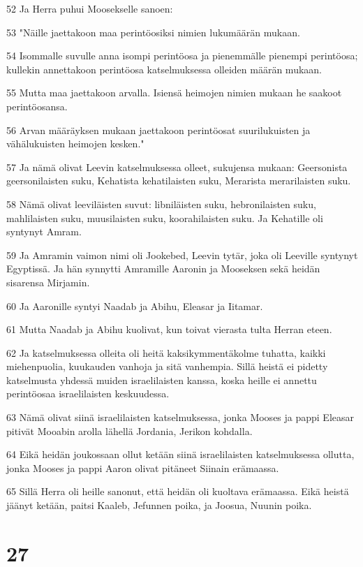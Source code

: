 \par 52 Ja Herra puhui Moosekselle sanoen:
\par 53 "Näille jaettakoon maa perintöosiksi nimien lukumäärän mukaan.
\par 54 Isommalle suvulle anna isompi perintöosa ja pienemmälle pienempi perintöosa; kullekin annettakoon perintöosa katselmuksessa olleiden määrän mukaan.
\par 55 Mutta maa jaettakoon arvalla. Isiensä heimojen nimien mukaan he saakoot perintöosansa.
\par 56 Arvan määräyksen mukaan jaettakoon perintöosat suurilukuisten ja vähälukuisten heimojen kesken."
\par 57 Ja nämä olivat Leevin katselmuksessa olleet, sukujensa mukaan: Geersonista geersonilaisten suku, Kehatista kehatilaisten suku, Merarista merarilaisten suku.
\par 58 Nämä olivat leeviläisten suvut: libniläisten suku, hebronilaisten suku, mahlilaisten suku, muusilaisten suku, koorahilaisten suku. Ja Kehatille oli syntynyt Amram.
\par 59 Ja Amramin vaimon nimi oli Jookebed, Leevin tytär, joka oli Leeville syntynyt Egyptissä. Ja hän synnytti Amramille Aaronin ja Mooseksen sekä heidän sisarensa Mirjamin.
\par 60 Ja Aaronille syntyi Naadab ja Abihu, Eleasar ja Iitamar.
\par 61 Mutta Naadab ja Abihu kuolivat, kun toivat vierasta tulta Herran eteen.
\par 62 Ja katselmuksessa olleita oli heitä kaksikymmentäkolme tuhatta, kaikki miehenpuolia, kuukauden vanhoja ja sitä vanhempia. Sillä heistä ei pidetty katselmusta yhdessä muiden israelilaisten kanssa, koska heille ei annettu perintöosaa israelilaisten keskuudessa.
\par 63 Nämä olivat siinä israelilaisten katselmuksessa, jonka Mooses ja pappi Eleasar pitivät Mooabin arolla lähellä Jordania, Jerikon kohdalla.
\par 64 Eikä heidän joukossaan ollut ketään siinä israelilaisten katselmuksessa ollutta, jonka Mooses ja pappi Aaron olivat pitäneet Siinain erämaassa.
\par 65 Sillä Herra oli heille sanonut, että heidän oli kuoltava erämaassa. Eikä heistä jäänyt ketään, paitsi Kaaleb, Jefunnen poika, ja Joosua, Nuunin poika.

\chapter{27}

